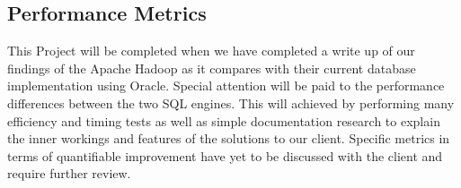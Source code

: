 \documentclass[letterpaper,10pt,fleqn,draftclsnofoot,onecolumn]{IEEEtran}
\begin{document}
	
	\subsection{Performance Metrics}
	This Project will be completed when we have completed a write up of our findings of the Apache Hadoop as it compares with their current database implementation using Oracle. Special attention will be paid to the performance differences between the two SQL engines. This will achieved by performing many efficiency and timing tests as well as simple documentation research to explain the inner workings and features of the solutions to our client. Specific metrics in terms of quantifiable improvement have yet to be discussed with the client and require further review.


	
\end{document}
